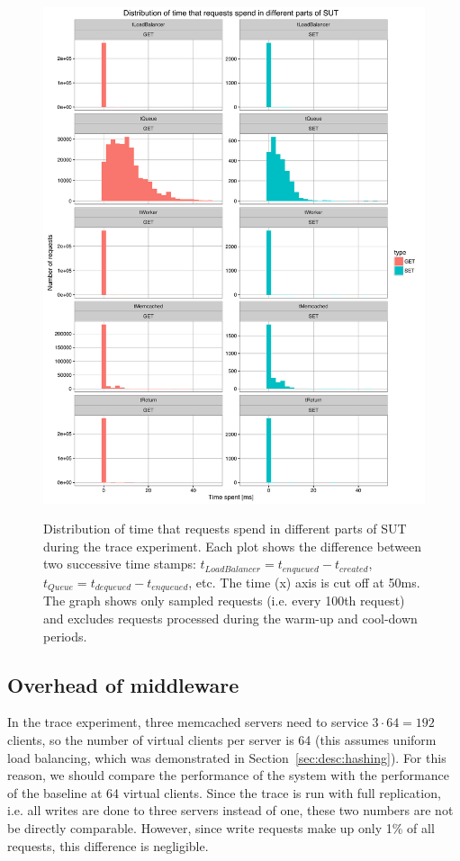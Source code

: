 \documentclass[11pt]{article}
\begin{document}
\begin{figure}[p]
\centering
\includegraphics[width=\textwidth]{../results/trace_rep3/graphs/time_breakdown.pdf}
\label{fig:rep3:time_breakdown}
\caption{Distribution of time that requests spend in different parts of SUT during the trace experiment. Each plot shows the difference between two successive time stamps: $t_{LoadBalancer}=t_{enqueued}-t_{created}$, $t_{Queue}=t_{dequeued} - t_{enqueued}$, etc. The time (x) axis is cut off at 50ms. The graph shows only sampled requests (i.e. every 100th request) and excludes requests processed during the warm-up and cool-down periods.}
\end{figure}

\subsection{Overhead of middleware}

In the trace experiment, three memcached servers need to service $3 \cdot 64 = 192$ clients, so the number of virtual clients per server is 64 (this assumes uniform load balancing, which was demonstrated in Section~\ref{sec:desc:hashing}). For this reason, we should compare the performance of the system with the performance of the baseline at 64 virtual clients. Since the trace is run with full replication, i.e. all writes are done to three servers instead of one, these two numbers are not be directly comparable. However, since write requests make up only 1\% of all requests, this difference is negligible.
\end{document}
